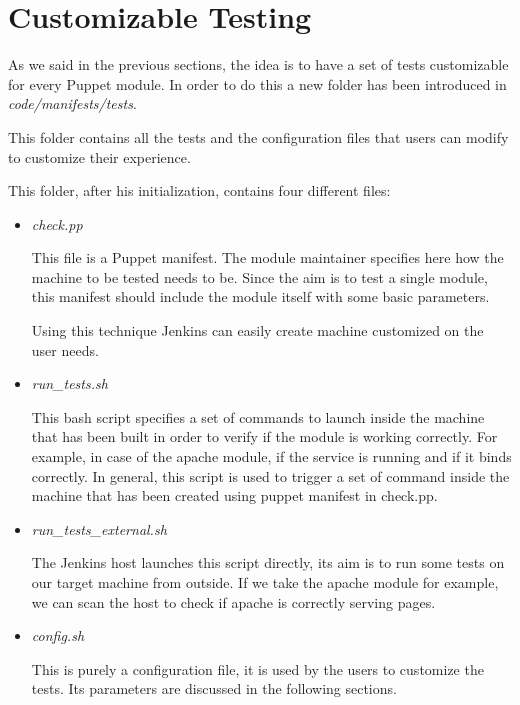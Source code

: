 \section{Customizable Testing}

As we said in the previous sections, the idea is to have a set of tests
customizable for every Puppet module. In order to do this a new folder has
been introduced in \textit{code/manifests/tests}.

This folder contains all the tests and the configuration files that users
can modify to customize their experience.

This folder, after his initialization, contains four different files:

\begin{itemize}
  \item \textit{check.pp}

This file is a Puppet manifest. The module maintainer specifies here how
the machine to be tested needs to be. Since the aim is to test a single
module, this manifest should include the module itself with some basic
parameters.

Using this technique Jenkins can easily create machine customized on the
user needs.

  \item \textit{run\_tests.sh}

This bash script specifies a set of commands to launch inside the machine
that has been built in order to verify if the module is working correctly.
For example, in case of the apache module, if the service is running and
if it binds correctly. In general, this script is used to trigger a set of
command inside the machine that has been created using puppet manifest in
check.pp.

  \item \textit{run\_tests\_external.sh}
  
The Jenkins host launches this script directly, its aim is to run some
tests on our target machine from outside. If we take the apache module for
example, we can scan the host to check if apache is correctly serving
pages.

  \item \textit{config.sh}
  
This is purely a configuration file, it is used by the users to customize
the tests. Its parameters are discussed in the following sections.

\end{itemize}

